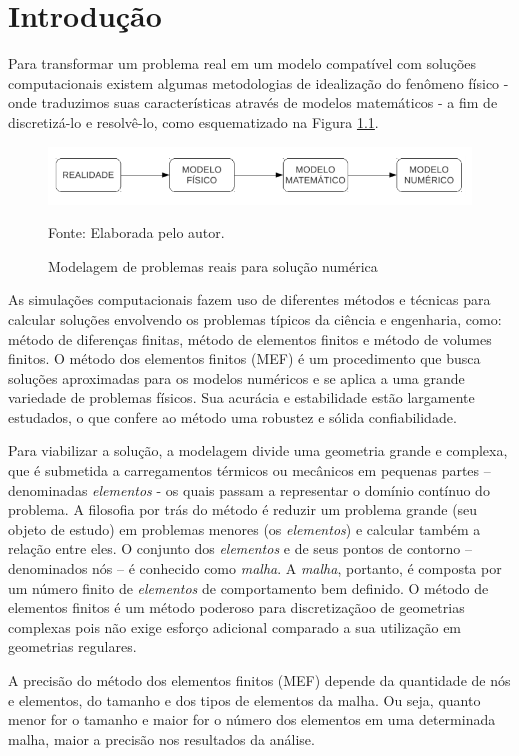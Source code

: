 \chapter{Introdução}

Para transformar um problema real em um modelo compatível com soluções computacionais existem algumas metodologias de idealização do fenômeno físico - onde traduzimos suas características através de modelos matemáticos - a fim de discretizá-lo e resolvê-lo, como esquematizado na Figura \ref{fig:modelos}.

\begin{figure}[hb]
\centering
\includegraphics[scale=0.7]{Imagens/Modelos}
\caption{Modelagem de problemas reais para solução numérica}
{\footnotesize Fonte: Elaborada pelo autor.}
\label{fig:modelos}
\end{figure}

As simulações computacionais fazem uso de diferentes métodos e técnicas para calcular soluções envolvendo os problemas típicos da ciência e engenharia, como: método de diferenças finitas, método de elementos finitos e método de volumes finitos. O método dos elementos finitos (MEF) é um procedimento que busca soluções aproximadas para os modelos numéricos e se aplica a uma grande variedade de problemas físicos. Sua acurácia e estabilidade estão largamente estudados, o que confere ao método uma robustez e sólida confiabilidade.

Para viabilizar a solução, a modelagem divide uma geometria grande e complexa, que é submetida a carregamentos térmicos ou mecânicos em pequenas partes – denominadas \textit{elementos} - os quais passam a representar o domínio contínuo do problema. A filosofia por trás do método é reduzir um problema grande (seu objeto de estudo) em problemas menores (os \textit{elementos}) e calcular também a relação entre eles. O conjunto dos \textit{elementos} e de seus pontos de contorno – denominados nós – é conhecido como \textit{malha}. A \textit{malha}, portanto, é composta por um número finito de \textit{elementos} de comportamento bem definido. O método de elementos finitos é um método poderoso para discretizaçãoo de geometrias complexas pois não exige esforço adicional comparado a sua utilização em geometrias regulares. 
 
A precisão do método dos elementos finitos (MEF) depende da quantidade de nós e elementos, do tamanho e dos tipos de elementos da malha. Ou seja, quanto menor for o tamanho e maior for o número dos elementos em uma determinada malha, maior a precisão nos resultados da análise.

